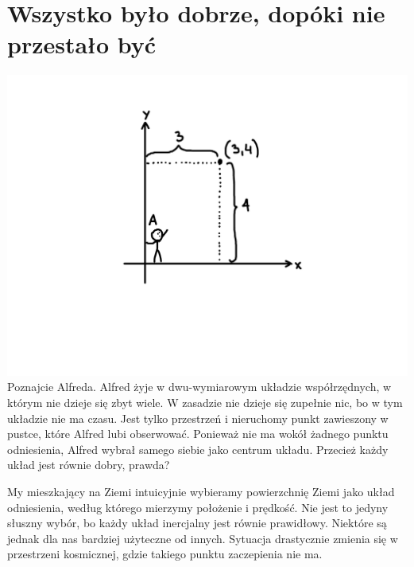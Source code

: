 \documentclass[10pt,twocolumn,fleqn,polish]{article}
\begin{document}
\section{Wszystko było dobrze, dopóki nie przestało być}
\noindent\includegraphics[width=1\linewidth]{pages/STA-page1}
Poznajcie Alfreda. Alfred żyje w dwu-wymiarowym układzie współrzędnych,
w którym nie dzieje się zbyt wiele. W zasadzie nie dzieje się zupełnie nic, bo
w tym układzie nie ma czasu. Jest tylko przestrzeń i nieruchomy punkt
zawieszony w pustce, które Alfred lubi obserwować. Ponieważ nie ma wokół żadnego
punktu odniesienia, Alfred wybrał samego siebie jako centrum układu.
Przecież każdy układ jest równie dobry, prawda?

My mieszkający na Ziemi intuicyjnie wybieramy powierzchnię Ziemi jako
układ odniesienia, według którego mierzymy położenie i prędkość.
Nie jest to jedyny słuszny wybór, bo każdy układ inercjalny jest równie prawidłowy.
Niektóre są jednak dla nas bardziej użyteczne od innych.
Sytuacja drastycznie zmienia się w przestrzeni kosmicznej, gdzie
takiego punktu zaczepienia nie ma.
\newpage
\end{document}

